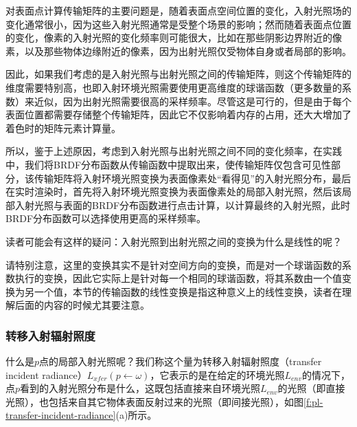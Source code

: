 对表面点计算传输矩阵的主要问题是，随着表面点空间位置的变化，入射光照场的变化通常很小，因为这些入射光照通常是受整个场景的影响；然而随着表面点位置的变化，像素的入射光照的变化频率则可能很大，比如在那些阴影边界附近的像素，以及那些物体边缘附近的像素，因为出射光照仅受物体自身或者局部的影响。

因此，如果我们考虑的是入射光照与出射光照之间的传输矩阵，则这个传输矩阵的维度需要特别高，也即入射环境光照需要使用更高维度的球谐函数（更多数量的系数）来近似，因为出射光照需要很高的采样频率。尽管这是可行的，但是由于每个表面位置都需要存储整个传输矩阵，因此它不仅影响着内存的占用，还大大增加了着色时的矩阵元素计算量。

所以，鉴于上述原因，考虑到入射光照与出射光照之间不同的变化频率，在实践中，我们将BRDF分布函数从传输函数中提取出来，使传输矩阵仅包含可见性部分，该传输矩阵将入射环境光照变换为表面像素处“看得见”的入射光照分布，最后在实时渲染时，首先将入射环境光照变换为表面像素处的局部入射光照，然后该局部入射光照与表面的BRDF分布函数进行点击计算，以计算最终的入射光照，此时BRDF分布函数可以选择使用更高的采样频率。

\begin{myshaded}
	读者可能会有这样的疑问：入射光照到出射光照之间的变换为什么是线性的呢？
	
	请特别注意，这里的变换其实不是针对空间方向的变换，而是对一个球谐函数的系数执行的变换，因此它实际上是针对每一个相同的球谐函数，将其系数由一个值变换为另一个值，本节的传输函数的线性变换是指这种意义上的线性变换，读者在理解后面的内容的时候尤其要注意。
\end{myshaded}




\subsubsection{转移入射辐射照度}
什么是$p$点的局部入射光照呢？我们称这个量为转移入射辐射照度（transfer incident radiance）$L_{xfer}(p\leftarrow \omega)$，它表示的是在给定的环境光照$L_{env}$的情况下，点$p$看到的入射光照分布是什么，这既包括直接来自环境光照$L_{env}$的光照（即直接光照），也包括来自其它物体表面反射过来的光照（即间接光照），如图\ref{f:pl-transfer-incident-radiance}(a)所示。

